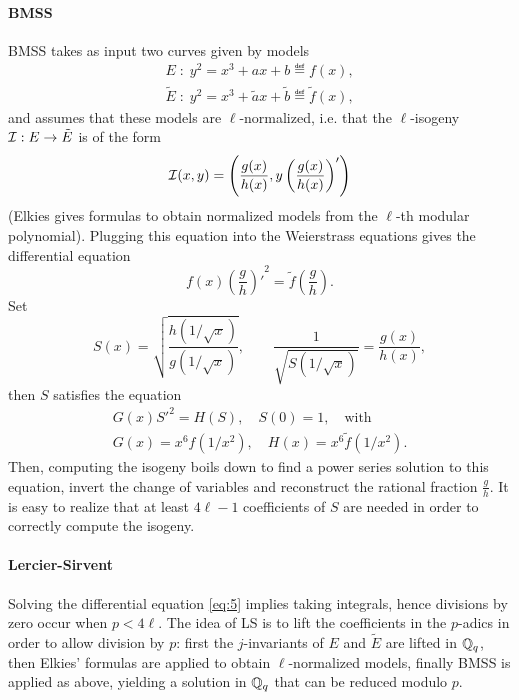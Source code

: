 \documentclass{article}
\begin{document}
\paragraph{BMSS}
BMSS takes as input two curves given by models
\begin{equation}
  \label{eq:1}
  \begin{gathered}
    E \;:\; y^2 = x^3 + ax + b \eqdef f(x),\\
    \tilde{E} \;:\; y^2 = x^3 + \tilde{a}x + \tilde{b} \eqdef \tilde{f}(x),
  \end{gathered}
\end{equation}
and assumes that these models are $\ell$-normalized, i.e. that the
$\ell$-isogeny $\mathcal{I}:E\to\tilde{E}$ is of the form
\begin{equation}
  \label{eq:2}
  \mathcal{I}(x,y) = \left(\frac{g(x)}{h(x)}, y\left(\frac{g(x)}{h(x)}\right)'\right)
\end{equation}
(Elkies \cite{elkies98} gives formulas to obtain normalized models
from the $\ell$-th modular polynomial). Plugging this equation into
the Weierstrass equations gives the differential equation
\begin{equation}
  \label{eq:3}
  f(x){\left(\frac{g}{h}\right)'}^2 = \tilde{f}\left(\frac{g}{h}\right).
\end{equation}
Set
\begin{equation}
  \label{eq:4}
  S(x) = \sqrt{\frac{h(1/\sqrt{x})}{g(1/\sqrt{x})}}, \qquad \frac{1}{\sqrt{S(1/\sqrt{x})}} = \frac{g(x)}{h(x)},
\end{equation}
then $S$ satisfies the equation
\begin{equation}
  \label{eq:5}
  \begin{gathered}
    G(x){S'}^2 = H(S), \quad S(0) = 1,\quad\text{with}\\
    G(x) = x^6f(1/x^2), \quad H(x) = x^6\tilde{f}(1/x^2).
  \end{gathered}
\end{equation}
Then, computing the isogeny boils down to find a power series solution
to this equation, invert the change of variables and reconstruct the
rational fraction $\frac{g}{h}$. It is easy to realize that at least
$4\ell-1$ coefficients of $S$ are needed in order to correctly compute
the isogeny.

\paragraph{Lercier-Sirvent}
Solving the differential equation \eqref{eq:5} implies taking
integrals, hence divisions by zero occur when $p<4\ell$. The idea of
LS is to lift the coefficients in the $p$-adics in order to allow
division by $p$: first the $j$-invariants of $E$ and $\tilde{E}$ are
lifted in $\mathbb{Q}_q$, then Elkies' formulas are applied to obtain
$\ell$-normalized models, finally BMSS is applied as above, yielding a
solution in $\mathbb{Q}_q$ that can be reduced modulo $p$. 
\end{document}
